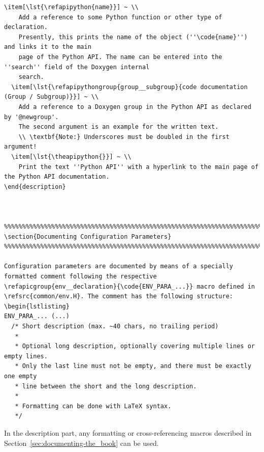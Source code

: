 \documentclass[12pt,english,parskip=half,headheight=19pt]{scrreprt}
\newcommand{\lst}[1]{\colorbox{lstbackground}{\footnotesize\code{#1}}}
\newcommand{\refdoc}[2]{\href{#1}{#2}}              %
\newcommand{\refsrc}[1]{\href{#1}{\texttt{#1}}}     %
\newcommand{\refapipython}[1]{\href{home2l-api_python/index.html}{\mbox{\texttt{#1}}}}  %
\newcommand{\refapicgroup}[2]{\href{home2l-api_c/group__#1.html}{#2}}
\newcommand{\refapipythongroup}[2]{\href{home2l-api_python/group__#1.html}{#2}}      %
\newcommand{\theapipython}{\refdoc{home2l-api_python/index.html}{Python API}}
\begin{document}
\begin{description}
{\begin{lstlisting}[language=<language>]
  \item[\lst{\refapipython{name}}] ~ \\
    Add a reference to some Python function or other type of declaration.
    Presently, this prints the name of the object (''\code{name}'') and links it to the main
    page of the Python API. The name can be entered into the ''search'' field of the Doxygen internal
    search.
  \item[\lst{\refapipythongroup{group__subgroup}{code documentation (Group / Subgroup)}}] ~ \\
    Add a reference to a Doxygen group in the Python API as declared by '@newgroup'.
    The second argument is an example for the written text.
    \\ \textbf{Note:} Underscores must be doubled in the first argument!
  \item[\lst{\theapipython{}}] ~ \\
    Print the text ''Python API'' with a hyperlink to the main page of the Python API documentation.
\end{description}



%%%%%%%%%%%%%%%%%%%%%%%%%%%%%%%%%%%%%%%%%%%%%%%%%%%%%%%%%%%%%%%%%%%%%%%%%%
\section{Documenting Configuration Parameters}
%%%%%%%%%%%%%%%%%%%%%%%%%%%%%%%%%%%%%%%%%%%%%%%%%%%%%%%%%%%%%%%%%%%%%%%%%%

Configuration parameters are documented by means of a specially formatted comment following the respective
\refapicgroup{env__declaration}{\code{ENV_PARA_...}} macro defined in \refsrc{common/env.H}. The comment has the following structure:
\begin{lstlisting}
ENV_PARA_... (...)
  /* Short description (max. ~40 chars, no trailing period)
   *
   * Optional long description, optionally covering multiple lines or empty lines.
   * Only the last line must not be empty, and there must be exactly one empty
   * line between the short and the long description.
   *
   * Formatting can be done with LaTeX syntax.
   */
\end{lstlisting}

In the description part, any formatting or cross-referencing macros described in Section~\ref{sec:documenting-the_book}
can be used.



}
\end{description}
\end{document}
